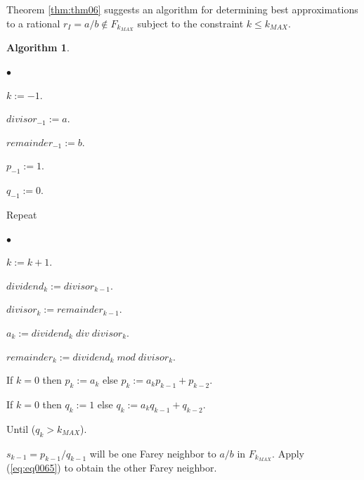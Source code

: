 \documentclass{esub2acm}
\newtheorem{algorithm}{Algorithm}
\newenvironment{alglvl0}{\begin{list}
               {$\bullet$}{\setlength{\labelwidth}{3mm}\setlength{\leftmargin}{6mm}}}
               {\end{list}}
\newenvironment{alglvl1}{\begin{list}
               {$\bullet$}{\setlength{\labelwidth}{3mm}\setlength{\leftmargin}{6mm}}}
               {\end{list}}
\begin{document}
Theorem \ref{thm:thm06} suggests an algorithm for determining best approximations to
a rational $r_I =a/b \notin F_{k_{MAX}}$ subject to the constraint $k \leq k_{MAX}$.

\begin{algorithm}\label{alg:bratrnnifnalg}\end{algorithm}
\begin{alglvl0}
\item $k := -1$.
\item $divisor_{-1} := a$.
\item $remainder_{-1} := b$.
\item $p_{-1} := 1$.
\item $q_{-1} := 0$.

\item Repeat

\begin{alglvl1}
\item $k := k + 1$.
\item $dividend_k := divisor_{k-1}$.
\item $divisor_k  := remainder_{k-1}$.
\item $a_k :=  dividend_k \; div \; divisor_k$.
\item $remainder_k := dividend_k \; mod \; divisor_k$.
\item If $k=0$ then $p_k := a_k$ else $p_k := a_k p_{k-1} + p_{k-2}$.
\item If $k=0$ then $q_k := 1$ else $q_k := a_k q_{k-1} + q_{k-2}$.
\end{alglvl1}

\item Until ($q_k > k_{MAX}$).
\item $s_{k-1} = p_{k-1}/q_{k-1}$ will be one Farey neighbor to $a/b$ in $F_{k_{MAX}}$.
      Apply (\ref{eq:eq0065}) to obtain the other Farey neighbor.
\end{alglvl0}
\end{document}
